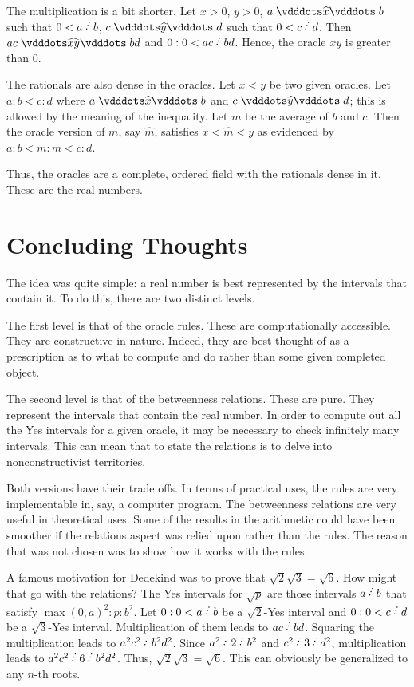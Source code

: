 \documentclass[12pt]{article}
\begin{document}
The multiplication is a bit shorter. Let $x >0 $, $y >0$, $a \xora b$ such that $0<a \lte b$, $c \xora[y] d$ such that $0 < c \lte d$. Then $ac \xora[xy] bd$ and $0:0 < ac \lte bd$. Hence, the oracle $xy$ is greater than 0. 

The rationals are also dense in the oracles. Let $x < y$ be two given oracles. Let $a:b < c:d$ where $a \xora b$ and $c \xora[y] d$; this is allowed by the meaning of the inequality. Let $m$ be the average of $b$ and $c$. Then the oracle version of $m$, say $\widehat{m}$, satisfies $x < \widehat{m} < y$ as evidenced by $a:b < m:m < c:d$.

Thus, the oracles are a complete, ordered field with the rationals dense in it. These are the real numbers. 


\section{Concluding Thoughts}

The idea was quite simple: a real number is best represented by the intervals that contain it. To do this, there are two distinct levels. 

The first level is that of the oracle rules. These are computationally accessible. They are constructive in nature. Indeed, they are best thought of as a prescription as to what to compute and do rather than some given completed object. 

The second level is that of the betweenness relations. These are pure. They represent the intervals that contain the real number. In order to compute out all the Yes intervals for a given oracle, it may be necessary to check infinitely many intervals. This can mean that to state the relations is to delve into nonconstructivist territories. 

Both versions have their trade offs. In terms of practical uses, the rules are very implementable in, say, a computer program. The betweenness relations are very useful in theoretical uses. Some of the results in the arithmetic could have been smoother if the relations aspect was relied upon rather than the rules. The reason that was not chosen was to show how it works with the rules. 

A famous motivation for Dedekind was to prove that $\sqrt{2} \sqrt{3} = \sqrt{6}$. How might that go with the relations? The Yes intervals for $\sqrt{p}$ are those intervals $a \lte b$ that satisfy $\max(0,a)^2 : p : b^2$. Let $0:0 < a \lte b$ be a $\sqrt{2}$-Yes interval and $0:0 < c\lte d$ be a $\sqrt{3}$-Yes interval. Multiplication of them leads to $ac \lte bd$. Squaring the multiplication leads to $a^2 c^2 \lte b^2 d^2$. Since $a^2 \lte 2 \lte b^2$ and $c^2 \lte 3 \lte d^2$, multiplication leads to $a^2 c^2 \lte 6 \lte b^2 d^2$. Thus, $\sqrt{2} \sqrt{3} = \sqrt{6}$. This can obviously be generalized to any $n$-th roots. 
\end{document}
